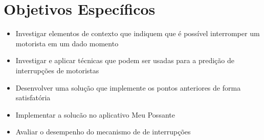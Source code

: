 \chapter{Objetivos Específicos}

\begin{itemize}
  \item Investigar elementos de contexto que indiquem que é possível interromper um motorista em um dado momento
  \item Investigar e aplicar técnicas que podem ser usadas para a predição de interrupções de motoristas
  \item Desenvolver uma solução que implemente os pontos anteriores de forma satisfatória
  \item Implementar a solucão no aplicativo Meu Possante \cite{meupossante}
  \item Avaliar o desempenho do mecanismo de de interrupções
\end{itemize}
